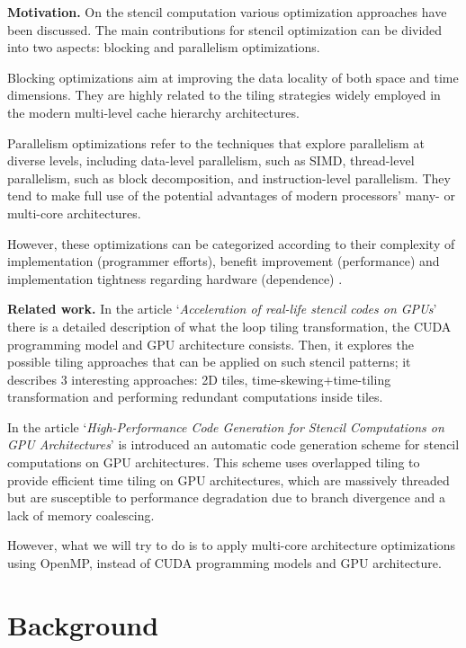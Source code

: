\documentclass[conference]{IEEEtran}
\newcommand{\mypar}[1]{{\bf #1.}}
\begin{document}
\mypar{Motivation} 
On the stencil computation various optimization approaches have been discussed. The main contributions for stencil optimization can be divided into two aspects: blocking and parallelism optimizations.\cite{su-zhang-mei}

Blocking optimizations aim at improving the data locality of both space and time dimensions. They are highly related to the tiling strategies widely employed in the modern multi-level cache hierarchy architectures.
 
Parallelism optimizations refer to the techniques that explore parallelism at diverse levels, including data-level parallelism, such as SIMD, thread-level parallelism, such as block decomposition, and instruction-level parallelism. They tend to make full use of the potential advantages of modern processors' many- or multi-core architectures. 

However, these optimizations can be categorized according to their complexity of implementation (programmer efforts), benefit improvement (performance) and implementation tightness regarding hardware (dependence) \cite{cruz}.

\mypar{Related work} 
In the article `\textit{Acceleration of real-life stencil codes on GPUs}' \cite{barigou} there is a detailed description of what the loop tiling transformation, the CUDA programming model and GPU architecture consists. Then, it explores the possible tiling approaches that can be applied on such stencil patterns; it describes 3 interesting approaches: 2D tiles, time-skewing+time-tiling transformation and performing redundant computations inside tiles.

In the article `\textit{High-Performance Code Generation for Stencil Computations on GPU Architectures}' \cite{holewinski-pouchet-sadayappan} 
is introduced an automatic code generation scheme for stencil computations on GPU architectures. This scheme uses overlapped tiling to provide efficient time tiling on GPU architectures, which are massively threaded but are susceptible to performance degradation due to branch divergence and a lack of memory coalescing. 

However, what we will try to do is to apply multi-core architecture optimizations using OpenMP, instead of CUDA programming models and GPU architecture.

\section{Background}\label{sec:background}
\end{document}
